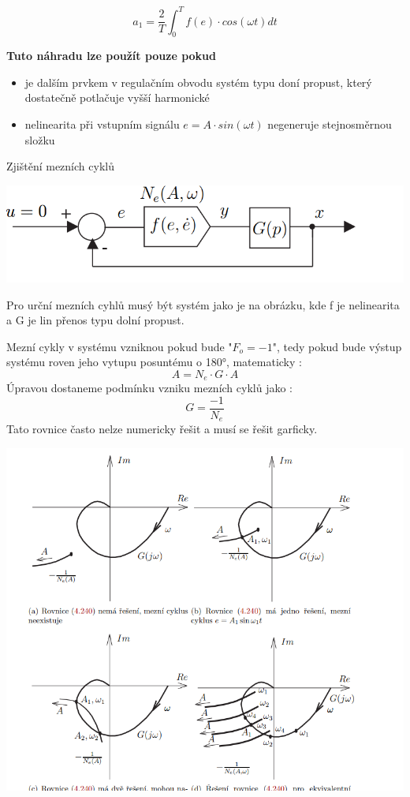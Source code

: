 \begin{equation*}
    a_1=\frac{2}{T} \int_{0}^{T} f(e) \cdot cos(\omega t) dt
\end{equation*}

{\bf Tuto náhradu lze použít pouze pokud}
\begin{itemize}
    \item je dalším prvkem v regulačním obvodu systém typu doní propust, který dostatečně potlačuje vyšší harmonické
    \item nelinearita při vstupním signálu $e=A\cdot sin (\omega t) $ negeneruje stejnosměrnou složku
\end{itemize}



Zjištění mezních cyklů 


\includegraphics{img/harm.rovnovha.png}

Pro urční mezních cyhlů musý být systém jako je na obrázku, kde f je nelinearita a G je lin přenos typu dolní propust.

Mezní cykly v systému vzniknou pokud bude "$ F_o =-1 $", tedy pokud bude výstup systému 
roven jeho vytupu posuntému o 180°, matematicky :
\begin{equation*}
    A= N_e \cdot G \cdot A
\end{equation*}
Úpravou dostaneme podmínku vzniku mezních cyklů jako :
\begin{equation*}
    G=\frac{-1}{N_e}
\end{equation*}
Tato rovnice často nelze numericky řešit a musí se řešit garficky.

\includegraphics{img/garf.reseni.png}

